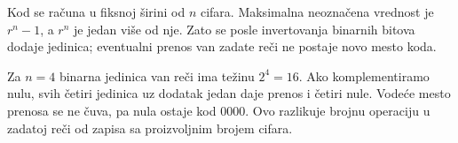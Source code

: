 
Kod se računa u fiksnoj širini od $n$ cifara. Maksimalna neoznačena vrednost je $r^n-1$, a $r^n$ je jedan više od nje. Zato se posle invertovanja binarnih bitova dodaje jedinica; eventualni prenos van zadate reči ne postaje novo mesto koda.

Za $n=4$ binarna jedinica van reči ima težinu $2^4=16$. Ako komplementiramo nulu, svih četiri jedinica uz dodatak jedan daje prenos i četiri nule. Vodeće mesto prenosa se ne čuva, pa nula ostaje kod $0000$. Ovo razlikuje brojnu operaciju u zadatoj reči od zapisa sa proizvoljnim brojem cifara.
